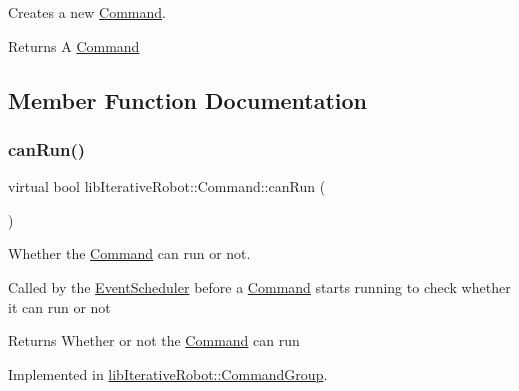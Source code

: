 Creates a new \mbox{\hyperlink{classlib_iterative_robot_1_1_command}{Command}}. 

\begin{DoxyReturn}{Returns}
A \mbox{\hyperlink{classlib_iterative_robot_1_1_command}{Command}} 
\end{DoxyReturn}


\subsection{Member Function Documentation}
\mbox{\label{classlib_iterative_robot_1_1_command_aebef0fdf029a15ee48fbb778c4265609}} 
\subsubsection{\texorpdfstring{canRun()}{canRun()}}
{\footnotesize\ttfamily virtual bool lib\+Iterative\+Robot\+::\+Command\+::can\+Run (\begin{DoxyParamCaption}{ }\end{DoxyParamCaption})\hspace{0.3cm}{\ttfamily [pure virtual]}}



Whether the \mbox{\hyperlink{classlib_iterative_robot_1_1_command}{Command}} can run or not. 

Called by the \mbox{\hyperlink{classlib_iterative_robot_1_1_event_scheduler}{Event\+Scheduler}} before a \mbox{\hyperlink{classlib_iterative_robot_1_1_command}{Command}} starts running to check whether it can run or not

\begin{DoxyReturn}{Returns}
Whether or not the \mbox{\hyperlink{classlib_iterative_robot_1_1_command}{Command}} can run 
\end{DoxyReturn}


Implemented in \mbox{\hyperlink{classlib_iterative_robot_1_1_command_group_abd75c9b52e6b4ae5af1b6724e865311f}{lib\+Iterative\+Robot\+::\+Command\+Group}}.

\mbox{\label{classlib_iterative_robot_1_1_command_a447ba6e394f165c6d358471a8bbdc76a}} 
